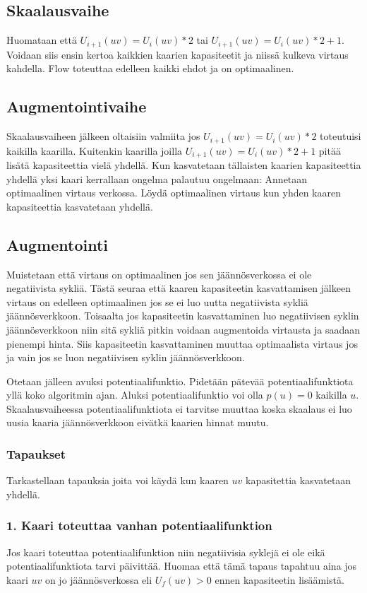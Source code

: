 \documentclass[a4paper, 11pt]{article}
\begin{document}
\subsection*{Skaalausvaihe}
Huomataan että $U_{i+1}(uv) = U_i(uv)*2$ tai $U_{i+1}(uv) = U_i(uv)*2+1$. Voidaan siis ensin kertoa
kaikkien kaarien kapasiteetit ja niissä kulkeva virtaus kahdella. Flow toteuttaa edelleen
kaikki ehdot ja on optimaalinen.
\subsection*{Augmentointivaihe}
Skaalausvaiheen jälkeen oltaisiin valmiita jos $U_{i+1}(uv) = U_i(uv)*2$ toteutuisi kaikilla
kaarilla. Kuitenkin kaarilla joilla $U_{i+1}(uv) = U_i(uv)*2+1$ pitää lisätä kapasiteettia 
vielä yhdellä.
Kun kasvatetaan tällaisten kaarien kapasiteettia yhdellä yksi kaari kerrallaan 
ongelma palautuu ongelmaan:
Annetaan optimaalinen virtaus verkossa. Löydä optimaalinen virtaus kun yhden kaaren 
kapasiteettia kasvatetaan yhdellä.
\subsection*{Augmentointi}
Muistetaan että virtaus on optimaalinen jos sen jäännösverkossa ei ole negatiivista
sykliä. Tästä seuraa että kaaren kapasiteetin kasvattamisen jälkeen virtaus on edelleen optimaalinen
jos se ei luo uutta negatiivista sykliä jäännösverkkoon. Toisaalta jos kapasiteetin
kasvattaminen luo negatiivisen syklin jäännösverkkoon niin sitä sykliä pitkin voidaan
augmentoida virtausta ja saadaan pienempi hinta. Siis kapasiteetin kasvattaminen 
muuttaa optimaalista virtaus
jos ja vain jos se luon negatiivisen syklin jäännösverkkoon. 

Otetaan jälleen avuksi potentiaalifunktio. Pidetään pätevää potentiaalifunktiota 
yllä koko algoritmin ajan. Aluksi potentiaalifunktio voi olla $p(u) = 0$ kaikilla $u$.
Skaalausvaiheessa potentiaalifunktiota ei tarvitse muuttaa koska skaalaus ei luo
uusia kaaria jäännösverkkoon eivätkä kaarien hinnat muutu.

\subsubsection*{Tapaukset}
Tarkastellaan tapauksia joita voi käydä kun kaaren $uv$ kapasitettia kasvatetaan 
yhdellä.
\subsubsection*{1. Kaari toteuttaa vanhan potentiaalifunktion}
Jos kaari toteuttaa potentiaalifunktion niin negatiivisia syklejä ei ole
eikä potentiaalifunktiota tarvi päivittää. Huomaa että tämä tapaus tapahtuu
aina jos kaari $uv$ on jo jäännösverkossa eli $U_f(uv) > 0$ ennen kapasiteetin
lisäämistä.
\end{document}
